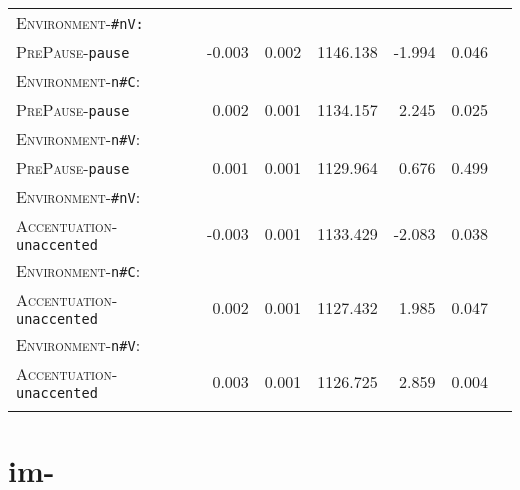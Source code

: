 \begin{table}
{\begin{tabular} {lrrrrrr}
		\textsc{Environment}-\texttt{\#nV:}&&&&&\\
		\textsc{PrePause}-\texttt{pause} & -0.003 & 0.002 & 1146.138 & -1.994 & 0.046 \\ 
		
		\textsc{Environment}-\texttt{n\#C}:&&&&&\\
		\textsc{PrePause}-\texttt{pause} & 0.002 & 0.001 & 1134.157 & 2.245 & 0.025 \\ 
		
		\textsc{Environment}-\texttt{n\#V}:&&&&&\\
		\textsc{PrePause}-\texttt{pause} & \color{lsLightGray} 0.001 & \color{lsLightGray} 0.001 & \color{lsLightGray} 1129.964 & \color{lsLightGray} 0.676 & \color{lsLightGray} 0.499 \\ 
		
		\textsc{Environment}-\texttt{\#nV}:&&&&&\\
		\textsc{Accentuation}-\texttt{unaccented} & -0.003 & 0.001 & 1133.429 & -2.083 & 0.038 \\ 
		
		\textsc{Environment}-\texttt{n\#C}:&&&&&\\
		\textsc{Accentuation}-\texttt{unaccented} & 0.002 & 0.001 & 1127.432 & 1.985 & 0.047 \\ 
		
		\textsc{Environment}-\texttt{n\#V}:&&&&&\\
		\textsc{Accentuation}-\texttt{unaccented} & 0.003 & 0.001 & 1126.725 & 2.859 & 0.004 \\ 
		\lspbottomrule 
			\end{tabular}
}


\end{table}


\section{{im-}}

